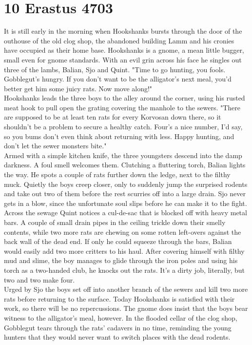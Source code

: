 \section{10 Erastus 4703}

It is still early in the morning when Hookshanks bursts through the door of the outhouse of the old clog shop, the abandoned building Lamm and his cronies have occupied as their home base. Hookshanks is a gnome, a mean little bugger, small even for gnome standards. With an evil grin across his face he singles out three of the lambs, Balian, Sjo and Quint. "Time to go hunting, you fools. Gobblegut's hungry. If you don't want to be the alligator's next meal, you'd better get him some juicy rats. Now move along!"\\

Hookshanks leads the three boys to the alley around the corner, using his rusted meat hook to pull open the grating covering the manhole to the sewers. "There are supposed to be at least ten rats for every Korvosan down there, so it shouldn't be a problem to secure a healthy catch. Four's a nice number, I'd say, so you bums don't even think about returning with less. Happy hunting, and don't let the sewer monsters bite."\\

Armed with a simple kitchen knife, the three youngsters descend into the damp darkness. A foul smell welcomes them. Clutching a fluttering torch, Balian lights the way. He spots a couple of rats further down the ledge, next to the filthy muck. Quietly the boys creep closer, only to suddenly jump the surprised rodents and take out two of them before the rest scurries off into a large drain. Sjo never gets in a blow, since the unfortunate soul slips before he can make it to the fight.\\

Across the sewage Quint notices a cul-de-sac that is blocked off with heavy metal bars. A couple of small drain pipes in the ceiling trickle down their smelly contents, while two more rats are chewing on some rotten left-overs against the back wall of the dead end. If only he could squeeze through the bars, Balian would easily add two more critters to his haul. After covering himself with filthy mud and slime, the boy manages to glide through the iron poles and using his torch as a two-handed club, he knocks out the rats. It's a dirty job, literally, but two and two make four.\\

Urged by Sjo the boys set off into another branch of the sewers and kill two more rats before returning to the surface. Today Hookshanks is satisfied with their work, so there will be no repercussions. The gnome does insist that the boys bear witness to the alligator's meal, however. In the flooded cellar of the clog shop, Gobblegut tears through the rats' cadavers in no time, reminding the young hunters that they would never want to switch places with the dead rodents.\\


